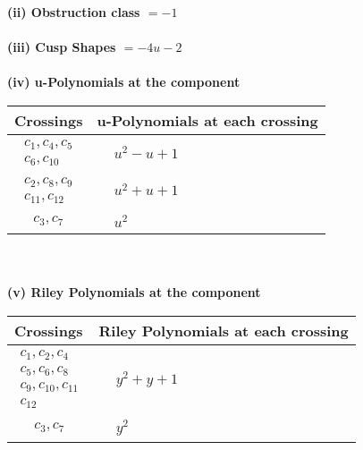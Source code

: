 \documentclass[1p]{elsarticle_modified}
\theoremstyle{definition}
\begin{document}
\flushleft \textbf{(ii) Obstruction class $= -1$}\\~\\
\flushleft \textbf{(iii) Cusp Shapes $= -4 u-2$}\\~\\
\newpage\renewcommand{\arraystretch}{1}
\flushleft \textbf{(iv) u-Polynomials at the component}\newline \\
\begin{tabular}{m{50pt}|m{274pt}}
Crossings & \hspace{64pt}u-Polynomials at each crossing \\
\hline $$\begin{aligned}c_{1},c_{4},c_{5}\\c_{6},c_{10}\end{aligned}$$&$\begin{aligned}
&u^2- u+1
\end{aligned}$\\
\hline $$\begin{aligned}c_{2},c_{8},c_{9}\\c_{11},c_{12}\end{aligned}$$&$\begin{aligned}
&u^2+u+1
\end{aligned}$\\
\hline $$\begin{aligned}c_{3},c_{7}\end{aligned}$$&$\begin{aligned}
&u^2
\end{aligned}$\\
\hline
\end{tabular}\\~\\
\newpage\renewcommand{\arraystretch}{1}
\flushleft \textbf{(v) Riley Polynomials at the component}\newline \\
\begin{tabular}{m{50pt}|m{274pt}}
Crossings & \hspace{64pt}Riley Polynomials at each crossing \\
\hline $$\begin{aligned}c_{1},c_{2},c_{4}\\c_{5},c_{6},c_{8}\\c_{9},c_{10},c_{11}\\c_{12}\end{aligned}$$&$\begin{aligned}
&y^2+y+1
\end{aligned}$\\
\hline $$\begin{aligned}c_{3},c_{7}\end{aligned}$$&$\begin{aligned}
&y^2
\end{aligned}$\\
\hline
\end{tabular}\\~\\
\end{document}
